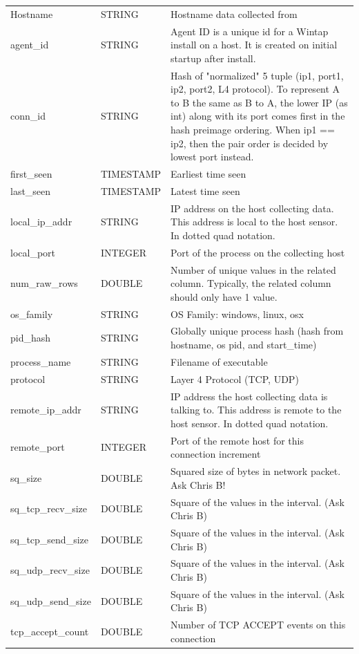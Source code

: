 \documentclass[conference,compsoc]{IEEEtran}
\begin{document}
\begin{longtable}{|p{5cm}|p{2cm}|p{9cm}|}
Hostname & STRING & Hostname data collected from \\
agent\_id & STRING & Agent ID is a unique id for a Wintap install on a host. It is created on initial startup after install. \\
conn\_id & STRING & Hash of "normalized" 5 tuple (ip1, port1, ip2, port2, L4 protocol). To represent A to B the same as B to A, the lower IP (as int) along with its port comes first in the hash preimage ordering. When ip1 == ip2, then the pair order is decided by lowest port instead. \\
first\_seen & TIMESTAMP & Earliest time seen \\
last\_seen & TIMESTAMP & Latest time seen \\
local\_ip\_addr & STRING & IP address on the host collecting data. This address is local to the host sensor. In dotted quad notation. \\
local\_port & INTEGER & Port of the process on the collecting host \\
num\_raw\_rows & DOUBLE & Number of unique values in the related column. Typically, the related column should only have 1 value. \\
os\_family & STRING & OS Family: windows, linux, osx \\
pid\_hash & STRING & Globally unique process hash (hash from hostname, os pid, and start\_time) \\
process\_name & STRING & Filename of executable \\
protocol & STRING & Layer 4 Protocol (TCP, UDP) \\
remote\_ip\_addr & STRING & IP address the host collecting data is talking to. This address is remote to the host sensor. In dotted quad notation. \\
remote\_port & INTEGER & Port of the remote host for this connection increment \\
sq\_size & DOUBLE & Squared size of bytes in network packet. Ask Chris B! \\
sq\_tcp\_recv\_size & DOUBLE & Square of the values in the interval. (Ask Chris B) \\
sq\_tcp\_send\_size & DOUBLE & Square of the values in the interval. (Ask Chris B) \\
sq\_udp\_recv\_size & DOUBLE & Square of the values in the interval. (Ask Chris B) \\
sq\_udp\_send\_size & DOUBLE & Square of the values in the interval. (Ask Chris B) \\
tcp\_accept\_count & DOUBLE & Number of TCP ACCEPT events on this connection \\

\end{longtable}
\end{document}
